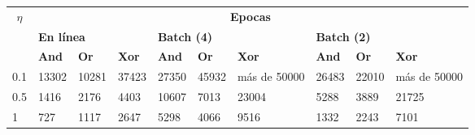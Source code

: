 \begin{table}[H]
    \begin{tabular}{|l|lllllllll|}
    \hline
    \multicolumn{1}{|c|}{\multirow{3}{*}{\textbf{$\eta$}}} & \multicolumn{9}{c|}{\textbf{Epocas}}                                                                                                                                                                                                                                                                      \\ \cline{2-10} 
    \multicolumn{1}{|c|}{}                                 & \multicolumn{3}{l|}{\textbf{En línea}}                                                                   & \multicolumn{3}{l|}{\textbf{Batch (4)}}                                                                  & \multicolumn{3}{l|}{\textbf{Batch (2)}}                                             \\ \cline{2-10} 
    \multicolumn{1}{|c|}{}                                 & \multicolumn{1}{l|}{\textbf{And}} & \multicolumn{1}{l|}{\textbf{Or}} & \multicolumn{1}{l|}{\textbf{Xor}} & \multicolumn{1}{l|}{\textbf{And}} & \multicolumn{1}{l|}{\textbf{Or}} & \multicolumn{1}{l|}{\textbf{Xor}} & \multicolumn{1}{l|}{\textbf{And}} & \multicolumn{1}{l|}{\textbf{Or}} & \textbf{Xor} \\ \hline
    0.1                                                    & \multicolumn{1}{l|}{13302}        & \multicolumn{1}{l|}{10281}       & \multicolumn{1}{l|}{37423}        & \multicolumn{1}{l|}{27350}        & \multicolumn{1}{l|}{45932}       & \multicolumn{1}{l|}{más de 50000} & \multicolumn{1}{l|}{26483}        & \multicolumn{1}{l|}{22010}       & más de 50000 \\ \hline
    0.5                                                    & \multicolumn{1}{l|}{1416}         & \multicolumn{1}{l|}{2176}        & \multicolumn{1}{l|}{4403}         & \multicolumn{1}{l|}{10607}        & \multicolumn{1}{l|}{7013}        & \multicolumn{1}{l|}{23004}        & \multicolumn{1}{l|}{5288}         & \multicolumn{1}{l|}{3889}        & 21725        \\ \hline
    1                                                      & \multicolumn{1}{l|}{727}          & \multicolumn{1}{l|}{1117}        & \multicolumn{1}{l|}{2647}         & \multicolumn{1}{l|}{5298}         & \multicolumn{1}{l|}{4066}        & \multicolumn{1}{l|}{9516}         & \multicolumn{1}{l|}{1332}         & \multicolumn{1}{l|}{2243}        & 7101         \\ \hline

\end{tabular}
\end{table}
